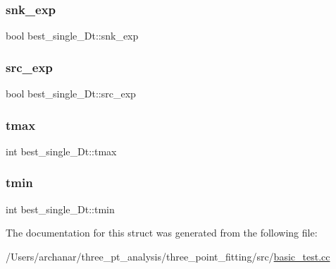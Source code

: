 \mbox{\label{structbest__single__Dt_ae9aa73684aaa8ce25e65313006c08d06}} 
\subsubsection{\texorpdfstring{snk\_exp}{snk\_exp}}
{\footnotesize\ttfamily bool best\+\_\+single\+\_\+\+Dt\+::snk\+\_\+exp}

\mbox{\label{structbest__single__Dt_ad32a09f26adf34121c258bf1234da1f8}} 
\subsubsection{\texorpdfstring{src\_exp}{src\_exp}}
{\footnotesize\ttfamily bool best\+\_\+single\+\_\+\+Dt\+::src\+\_\+exp}

\mbox{\label{structbest__single__Dt_a31995288cfd0198e222aba9b153e9a33}} 
\subsubsection{\texorpdfstring{tmax}{tmax}}
{\footnotesize\ttfamily int best\+\_\+single\+\_\+\+Dt\+::tmax}

\mbox{\label{structbest__single__Dt_aa41c8d5882c59f2ddd877e18971a7276}} 
\subsubsection{\texorpdfstring{tmin}{tmin}}
{\footnotesize\ttfamily int best\+\_\+single\+\_\+\+Dt\+::tmin}



The documentation for this struct was generated from the following file\+:\begin{DoxyCompactItemize}
\item 
/\+Users/archanar/three\+\_\+pt\+\_\+analysis/three\+\_\+point\+\_\+fitting/src/\mbox{\hyperlink{basic__test_8cc}{basic\+\_\+test.\+cc}}\end{DoxyCompactItemize}
